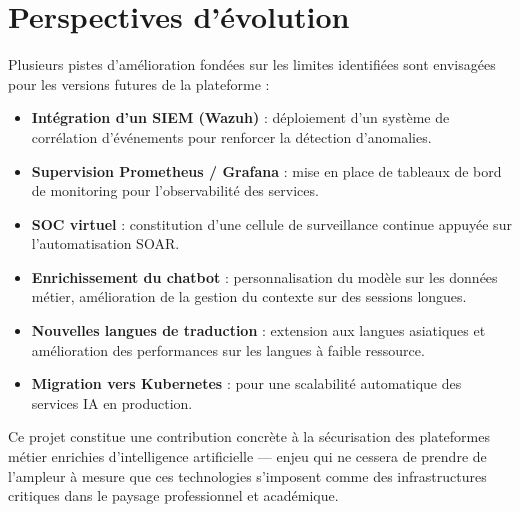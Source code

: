 \section*{Perspectives d'évolution}
Plusieurs pistes d'amélioration fondées sur les limites identifiées sont envisagées pour les versions futures de la plateforme :
\begin{itemize}
    \item \textbf{Intégration d'un SIEM (Wazuh)} : déploiement d'un système de corrélation d'événements pour renforcer la détection d'anomalies.
    \item \textbf{Supervision Prometheus / Grafana} : mise en place de tableaux de bord de monitoring pour l'observabilité des services.
    \item \textbf{SOC virtuel} : constitution d'une cellule de surveillance continue appuyée sur l'automatisation SOAR.
    \item \textbf{Enrichissement du chatbot} : personnalisation du modèle sur les données métier, amélioration de la gestion du contexte sur des sessions longues.
    \item \textbf{Nouvelles langues de traduction} : extension aux langues asiatiques et amélioration des performances sur les langues à faible ressource.
    \item \textbf{Migration vers Kubernetes} : pour une scalabilité automatique des services IA en production.
\end{itemize}

Ce projet constitue une contribution concrète à la sécurisation des plateformes métier enrichies d'intelligence artificielle — enjeu qui ne cessera de prendre de l'ampleur à mesure que ces technologies s'imposent comme des infrastructures critiques dans le paysage professionnel et académique.
